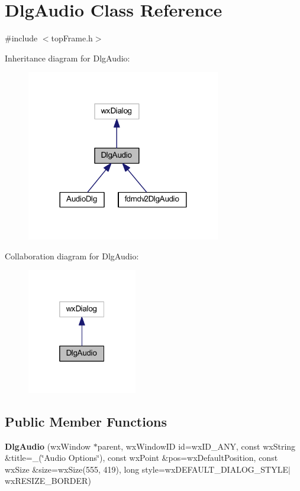 \hypertarget{class_dlg_audio}{\section{Dlg\-Audio Class Reference}
\label{class_dlg_audio}
}


{\ttfamily \#include $<$top\-Frame.\-h$>$}



Inheritance diagram for Dlg\-Audio\-:\nopagebreak
\begin{figure}[H]
\begin{center}
\leavevmode
\includegraphics[width=240pt]{class_dlg_audio__inherit__graph}
\end{center}
\end{figure}


Collaboration diagram for Dlg\-Audio\-:\nopagebreak
\begin{figure}[H]
\begin{center}
\leavevmode
\includegraphics[width=136pt]{class_dlg_audio__coll__graph}
\end{center}
\end{figure}
\subsection*{Public Member Functions}
\begin{DoxyCompactItemize}
\item 
\hypertarget{class_dlg_audio_a95fa3d4e8550bf2a16b8562c9c518eae}{{\bfseries Dlg\-Audio} (wx\-Window $\ast$parent, wx\-Window\-I\-D id=wx\-I\-D\-\_\-\-A\-N\-Y, const wx\-String \&title=\-\_\-(\char`\"{}Audio Options\char`\"{}), const wx\-Point \&pos=wx\-Default\-Position, const wx\-Size \&size=wx\-Size(555, 419), long style=wx\-D\-E\-F\-A\-U\-L\-T\-\_\-\-D\-I\-A\-L\-O\-G\-\_\-\-S\-T\-Y\-L\-E$|$wx\-R\-E\-S\-I\-Z\-E\-\_\-\-B\-O\-R\-D\-E\-R)}\label{class_dlg_audio_a95fa3d4e8550bf2a16b8562c9c518eae}

\end{DoxyCompactItemize}
